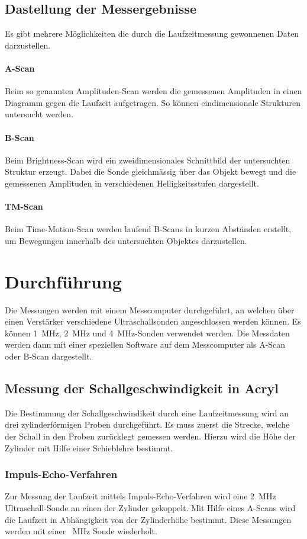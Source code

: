 \documentclass[11pt,ngerman,a4paper]{article}
\begin{document}
\subsection{Dastellung der Messergebnisse}
Es gibt mehrere M\"oglichkeiten die durch die Laufzeitmessung gewonnenen Daten darzustellen.
\paragraph{A-Scan} Beim so genannten Amplituden-Scan werden die gemessenen Amplituden in einen Diagramm gegen die Laufzeit aufgetragen. So k\"onnen eindimensionale Strukturen untersucht werden. 
\paragraph{B-Scan}
Beim Brightness-Scan wird ein zweidimensionales Schnittbild der untersuchten Struktur erzeugt. Dabei die Sonde gleichm\"assig \"uber das Objekt bewegt und die gemessenen Amplituden in verschiedenen Helligkeitsstufen dargestellt.  
\paragraph{TM-Scan} Beim Time-Motion-Scan werden laufend B-Scans in kurzen Abst\"anden erstellt, um Bewegungen innerhalb des untersuchten Objektes darzustellen.

\section{Durchf\"uhrung }
Die Messungen werden mit einem Messcomputer durchgeführt, an welchen über einen Verstärker verschiedene Ultraschallsonden angeschlossen werden können. Es können \SI{1}{\mega\hertz}, \SI{2}{\mega  \hertz} und \SI{4}{\mega\hertz}-Sonden verwendet werden. Die Messdaten werden dann mit einer speziellen Software auf dem Messcomputer als A-Scan oder B-Scan dargestellt.
\subsection{Messung der Schallgeschwindigkeit in Acryl}
Die Bestimmung der Schallgeschwindikeit durch eine Laufzeitmessung wird an drei zylinderf\"ormigen Proben durchgef\"uhrt. Es muss zuerst die Strecke, welche der Schall in den Proben zur\"ucklegt gemessen werden. Hierzu wird die H\"ohe der Zylinder mit Hilfe einer Schieblehre bestimmt.  
\subsubsection{Impuls-Echo-Verfahren}
Zur Messung der Laufzeit mittels Impuls-Echo-Verfahren wird eine \SI{2}{\mega\hertz} Ultraschall-Sonde an einen der Zylinder gekoppelt. Mit Hilfe eines A-Scans wird die Laufzeit in Abh\"angigkeit von der Zylinderh\"ohe bestimmt. Diese Messungen werden mit einer \SI{}{\mega\hertz} Sonde wiederholt. 
\end{document}
